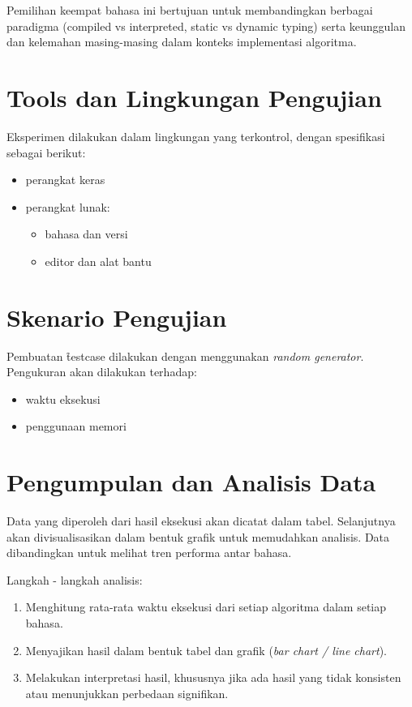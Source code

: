 Pemilihan keempat bahasa ini bertujuan untuk membandingkan berbagai paradigma (compiled vs interpreted, static vs dynamic typing) serta keunggulan dan kelemahan masing-masing dalam konteks implementasi algoritma.

\section{Tools dan Lingkungan Pengujian}
\label{sec:perangkatPengujian}
Eksperimen dilakukan dalam lingkungan yang terkontrol, dengan spesifikasi sebagai berikut:
\begin{itemize}
	\item perangkat keras \\
	\item perangkat lunak:
	      \begin{itemize}
		      \item bahasa dan versi
		      \item editor dan alat bantu
	      \end{itemize}
\end{itemize}

\section{Skenario Pengujian}
\label{sec:skenarioPengujian}
Pembuatan \f{testcase} dilakukan dengan menggunakan \textit{random generator}. Pengukuran akan dilakukan terhadap:
\begin{itemize}
	\item waktu eksekusi
	\item penggunaan memori
\end{itemize}

\section{Pengumpulan dan Analisis Data}
\label{sec:pengumpulanAnalisisData}
Data yang diperoleh dari hasil eksekusi akan dicatat dalam tabel. Selanjutnya akan divisualisasikan dalam bentuk grafik untuk memudahkan analisis. Data dibandingkan untuk melihat tren performa antar bahasa.

Langkah - langkah analisis:
\begin{enumerate}
	\item Menghitung rata-rata waktu eksekusi dari setiap algoritma dalam setiap bahasa.
	\item Menyajikan hasil dalam bentuk tabel dan grafik (\textit{bar chart / line chart}).
	\item Melakukan interpretasi hasil, khususnya jika ada hasil yang tidak konsisten atau menunjukkan perbedaan signifikan.
\end{enumerate}